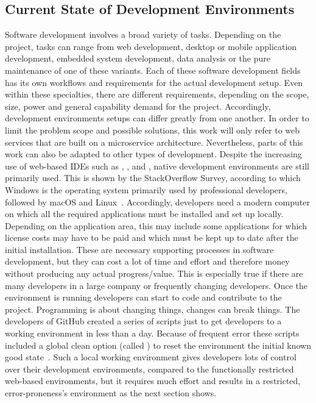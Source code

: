 \documentclass[12pt, a4paper]{article}
\begin{document}
    \subsection{Current State of Development Environments}
    Software development involves a broad variety of tasks. Depending on the project, tasks can range from web development, desktop or mobile application development, embedded system development, data analysis or the pure maintenance of one of these variants. Each of these software development fields has its own workflows and requirements for the actual development setup. Even within these specialties, there are different requirements, depending on the scope, size, power and general capability demand for the project. Accordingly, development environments setups can differ greatly from one another. In order to limit the problem scope and possible solutions, this work will only refer to web services that are built on a microservice architecture. Nevertheless, parts of this work can also be adapted to other types of development.\newline
    Despite the increasing use of web-based \ac{IDE}s such as , ,  and , native development environments are still primarily used. This is shown by the StackOverflow Survey, according to which Windows is the operating system primarily used by professional developers, followed by macOS and Linux~\cite{stackoverflow2021}. Accordingly, developers need a modern computer on which all the required applications must be installed and set up locally. Depending on the application area, this may include some applications for which license costs may have to be paid and which must be kept up to date after the initial installation. These are necessary supporting processes in software development, but they can cost a lot of time and effort and therefore money without producing any actual progress/value. This is especially true if there are many developers in a large company or frequently changing developers. Once the environment is running developers can start to code and contribute to the project. Programming is about changing things, changes can break things. The developers of GitHub created a series of scripts just to get developers to a working environment in less than a day. Because of frequent error these scripts included a global clean option (called ) to reset the environment the initial known good state~\cite{githubblogcodespace}.\newline
    Such a local working environment gives developers lots of control over their development environments, compared to the functionally restricted web-based environments, but it requires much effort and results in a restricted, error-proneness's environment as the next section shows.
\end{document}
